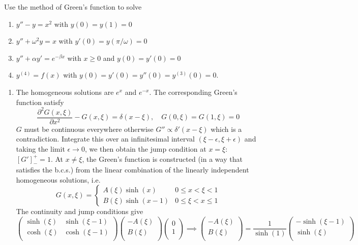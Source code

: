 \documentclass[a4paper]{article}
\begin{document}
\begin{qns}
Use the method of Green's function to solve
\begin{enumerate}[label=(\alph*)]
    \item $y''-y=x^2$ with $y(0)=y(1)=0$
    \item $y''+\omega^2y=x$ with $y'(0)=y(\pi/\omega)=0$
    \item $y''+\alpha y'=e^{-\beta x}$ with $x\geq0$ and $y(0)=y'(0)=0$
    \item $y^{(4)}=f(x)$ with $y(0)=y'(0)=y''(0)=y^{(3)}(0)=0$.
\end{enumerate}
\end{qns}
\begin{ans}\leavevmode
\begin{enumerate}[label=(\alph*)]
    \item The homogeneous solutions are $e^x$ and $e^{-x}$. The corresponding Green's function satisfy
    $$\frac{\partial^2G(x,\xi)}{\partial x^2}-G(x,\xi)=\delta(x-\xi),\quad G(0,\xi)=G(1,\xi)=0$$
    $G$ must be continuous everywhere otherwise $G''\propto\delta'(x-\xi)$ which is a contradiction. Integrate this over an infinitesimal interval $(\xi-\epsilon,\xi+\epsilon)$ and taking the limit $\epsilon\rightarrow 0$, we then obtain the jump condition at $x=\xi$: $[G']_-^+=1$. At $x\neq\xi$, the Green's function is constructed (in a way that satisfies the b.c.s.) from the linear combination of the linearly independent homogeneous solutions, i.e.
$$G(x,\xi)=
\left\{
        \begin{array}{ll}
      A(\xi)\sinh(x) & 0\leq x<\xi<1 \\
      B(\xi)\sinh(x-1) & 0\leq\xi< x\leq 1 
        \end{array}
    \right.$$
The continuity and jump conditions give
$$\begin{pmatrix}\sinh(\xi)&\sinh(\xi-1)\\\cosh(\xi)&\cosh(\xi-1)\\\end{pmatrix}\begin{pmatrix}-A(\xi)\\B(\xi)\\\end{pmatrix}\begin{pmatrix}0\\1\\\end{pmatrix}\implies\begin{pmatrix}-A(\xi)\\B(\xi)\\\end{pmatrix}=\frac{1}{\sinh(1)}\begin{pmatrix}-\sinh(\xi-1)\\\sinh(\xi)\\\end{pmatrix}$$

\end{enumerate}
\end{ans}
\end{document}
